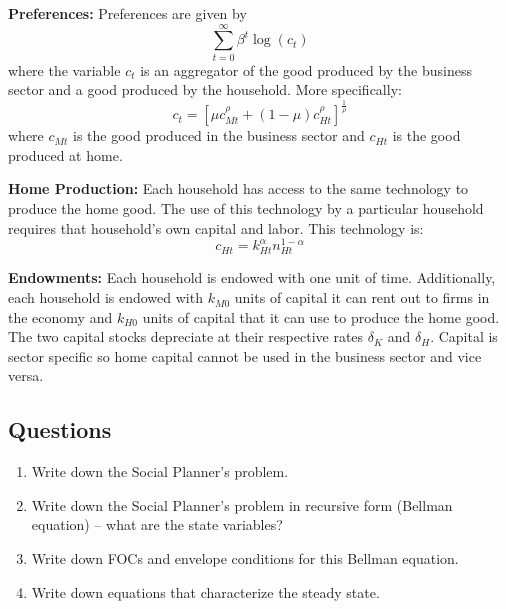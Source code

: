 \documentclass[10pt, a4paper]{article}
\begin{document}
    \textbf{Preferences:} Preferences are given by
    \begin{equation*}
    \sum_{t=0}^{\infty} \beta^t \log(c_t)
    \end{equation*}
    where the variable $c_t$ is an aggregator of the good produced by the business sector and a good produced by the household. More specifically:
    \begin{equation*}
    c_t = [\mu c_{Mt}^\rho + (1-\mu)c_{Ht}^\rho]^{\frac{1}{\rho}}
    \end{equation*}
    where $c_{Mt}$ is the good produced in the business sector and $c_{Ht}$ is the good produced at home.

    \textbf{Home Production:} Each household has access to the same technology to produce the home good. The use of this technology by a particular household requires that household's own capital and labor. This technology is:
    \begin{equation*}
    c_{Ht} = k_{Ht}^\alpha n_{Ht}^{1-\alpha}
    \end{equation*}

    \textbf{Endowments:} Each household is endowed with one unit of time. Additionally, each household is endowed with $k_{M0}$ units of capital it can rent out to firms in the economy and $k_{H0}$ units of capital that it can use to produce the home good. The two capital stocks depreciate at their respective rates $\delta_K$ and $\delta_H$. Capital is sector specific so home capital cannot be used in the business sector and vice versa.

  \subsection*{Questions}
    \begin{enumerate}
    \item Write down the Social Planner's problem.
    \item Write down the Social Planner's problem in recursive form (Bellman equation) – what are the state variables?
    \item Write down FOCs and envelope conditions for this Bellman equation.
    \item Write down equations that characterize the steady state.
    \end{enumerate}
\end{document}
